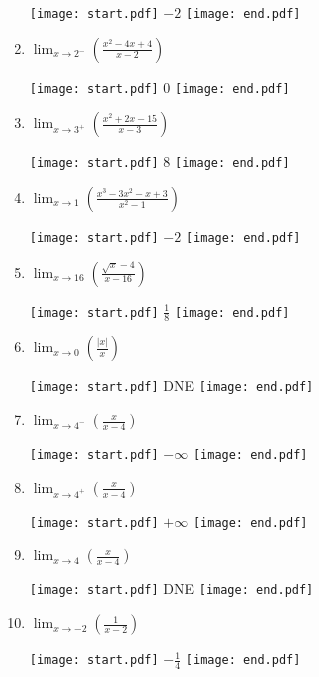 \documentclass[12pt]{article}
\begin{document}
\begin{enumerate}
\texttt{[image: start.pdf]}
{{$-2$}}
\texttt{[image: end.pdf]}

 
\item $\displaystyle \lim_{x\rightarrow 2^-}{\left(\frac{x^2-4x+4}{x-2}\right)}$ 

\texttt{[image: start.pdf]}
{{0}}
\texttt{[image: end.pdf]}

 
 \item $\displaystyle \lim_{x\rightarrow 3^+}{\left(\frac{x^2+2x-15}{x-3}\right)}$

\texttt{[image: start.pdf]}
{{8}}
\texttt{[image: end.pdf]}


\item $\displaystyle \lim_{x \rightarrow 1}{\left(\frac{x^3-3x^2-x+3}{x^2-1}\right)}$

\texttt{[image: start.pdf]}
{{$-2$}}
\texttt{[image: end.pdf]}


\item $\displaystyle \lim_{x\rightarrow 16}{\left(\frac{\sqrt{x}-4}{x-16}\right)}$

\texttt{[image: start.pdf]}
{{$\displaystyle \frac{1}{8}$}}
\texttt{[image: end.pdf]}


\item $\lim_{x \rightarrow 0}\left(\frac{|x|}{x}\right)$

\texttt{[image: start.pdf]}
{{DNE}}
\texttt{[image: end.pdf]}


\item $\displaystyle \lim_{x\rightarrow 4^-}{\left(\frac {x}{x-4}\right)}$

\texttt{[image: start.pdf]}
{{$-\infty$}}
\texttt{[image: end.pdf]}


\item  $\displaystyle \lim_{x\rightarrow 4^+}{\left(\frac{x}{x-4}\right)}$

\texttt{[image: start.pdf]}
{{$+\infty$}}
\texttt{[image: end.pdf]}


\item $\displaystyle \lim_{x\rightarrow 4}{\left(\frac{x}{x-4}\right)}$

\texttt{[image: start.pdf]}
{{DNE}}
\texttt{[image: end.pdf]}


\item $\displaystyle \lim_{x\rightarrow -2}{\left(\frac{1}{x-2}\right)}$

\texttt{[image: start.pdf]}
{{$\displaystyle -\frac{1}{4}$}}
\texttt{[image: end.pdf]}



\end{enumerate}
\end{document}
